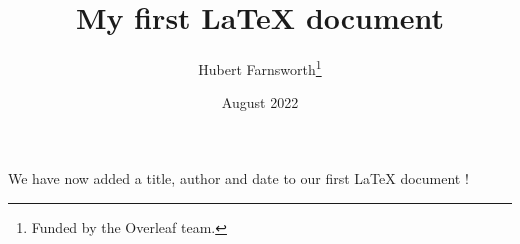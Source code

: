 \documentclass[12pt, letterpaper]{article}
\title{My first LaTeX document}
\author{Hubert Farnsworth\thanks{Funded by the Overleaf team.}}
\date{August 2022}
\begin{document}
\maketitle
We have now added a title, author and date to our first \LaTeX{} document \cite{texbook}!


\end{document}
